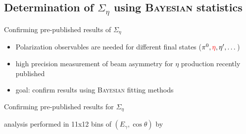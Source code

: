 \documentclass[11pt,aspectratio=169,dvipsnames]{beamer}
\newcommand{\thecolor}{black!70!blue}
\begin{document}
	\subsection{Determination of $\Sigma_\eta$ using \textsc{Bayesian} statistics}
		\begin{frame}{Confirming pre-published results of $\Sigma_\eta$}
		\begin{itemize}
			\item Polarization observables are needed for different final states ($\pi^0,{\color{red}\eta},\eta',\dots$)
			\item high precision measurement of beam asymmetry for $\eta$ production recently published {\cites{eta}}
			\item goal: confirm results using \textsc{Bayesian} fitting methods
		\end{itemize}
		
	\end{frame}
	\begin{frame}{Confirming pre-published results for $\Sigma_\eta$}
		
		\begin{minipage}{\linewidth}
			\begin{tcolorbox}[colback=blue!5,colframe=\thecolor,title={Event selection ($\eta$)}]
				analysis performed in 11x12 bins of $(E_\gamma,\cos\theta)$ by {\cites{eta}}
			\end{tcolorbox}
		\end{minipage}
		\begin{minipage}{\linewidth}
			\begin{tcolorbox}[colback=blue!5,colframe=\thecolor,title={Methods}]
				
			
			\end{tcolorbox}
		\end{minipage}
	\end{frame}
\end{document}
